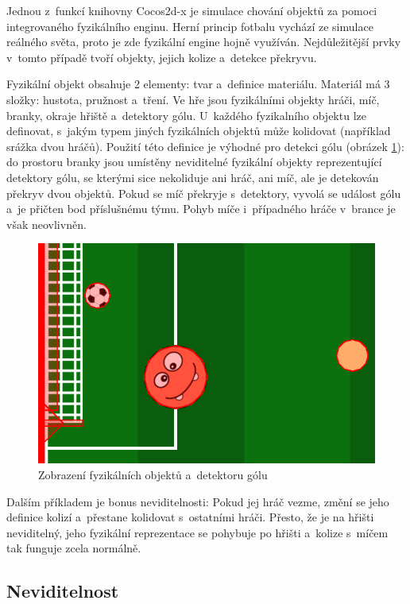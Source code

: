 \documentclass[thesis=B,czech,hidelinks]{FITthesis}[2012/06/26] %
\begin{document}
Jednou z~funkcí knihovny Cocos2d-x je simulace chování objektů za pomoci integrovaného fyzikálního enginu. Herní princip fotbalu vychází ze simulace reálného světa, proto je zde fyzikální engine hojně využíván. Nejdůležitější prvky v~tomto případě tvoří objekty, jejich kolize a~detekce překryvu.

Fyzikální objekt obsahuje 2 elementy: tvar a~definice materiálu. Materiál má 3 složky: hustota, pružnost a~tření. Ve hře jsou fyzikálními objekty hráči, míč, branky, okraje hřiště a~detektory gólu. U~každého fyzikalního objektu lze definovat, s~jakým typem jiných fyzikálních objektů může kolidovat (například srážka dvou hráčů). Použití této definice je výhodné pro detekci gólu (obrázek \ref{picture:goal_detector}): do prostoru branky jsou umístěny neviditelné fyzikální objekty reprezentující detektory gólu, se kterými sice nekoliduje ani hráč, ani míč, ale je detekován překryv dvou objektů. Pokud se míč překryje s~detektory, vyvolá se událost gólu a~je přičten bod příslušnému týmu. Pohyb míče i~případného hráče v~brance je však neovlivněn.

\begin{figure}
\center
\includegraphics{goal_detector}
\caption{Zobrazení fyzikálních objektů a~detektoru gólu}
\label{picture:goal_detector}
\end{figure}

Dalším příkladem je bonus neviditelnosti: Pokud jej hráč vezme, změní se jeho definice kolizí a~přestane kolidovat s~ostatními hráči. Přesto, že je na hřišti neviditelný, jeho fyzikální reprezentace se pohybuje po hřišti a~kolize s~míčem tak funguje zcela normálně.

\subsection{Neviditelnost}
\end{document}
